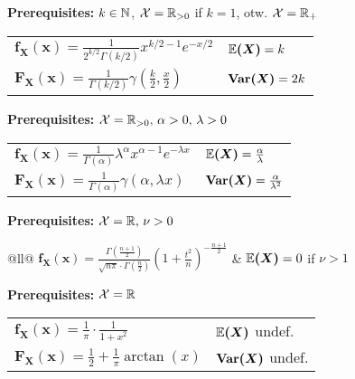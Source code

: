 \begin{cdefinition*}
  \textbf{Prerequisites:} \(k \in \mathbb{N}\), \(\operatorname{\mathcal{X}} = \mathbb{R}_{>0}\) if \(k = 1\), otw. \(\operatorname{\mathcal{X}} = \mathbb{R}_+\) \\
  \begin{tabularx}{\linewidth}{@{}ll@{}}
    \(\bm{f_X(x)} = \frac{1}{2^{k/2}\Gamma(k/2)} x^{k/2-1}e^{-x/2}\) & \(\bm{\mathbb{E}(X)} = k\) \\
    \(\bm{F_X(x)} = \frac{1}{\Gamma(k/2)} \gamma\left(\frac{k}{2}, \frac{x}{2}\right)\) & \(\bm{\Var(X)} = 2k\)
  \end{tabularx}
\end{cdefinition*}

\begin{cdefinition*}
  \textbf{Prerequisites:} \(\operatorname{\mathcal{X}} = \mathbb{R}_{>0}, \, \alpha > 0, \, \lambda > 0\) \\
  \begin{tabularx}{\linewidth}{@{}ll@{}}
    \(\bm{f_X(x)} = \frac{1}{\Gamma(\alpha)} \lambda^\alpha x^{\alpha - 1}e^{-\lambda x}\) & \(\bm{\mathbb{E}(X)} = \frac{\alpha}{\lambda}\) \\
    \(\bm{F_X(x)} = \frac{1}{\Gamma(\alpha)} \gamma(\alpha, \lambda x)\) & \(\bm{\Var(X)} = \frac{\alpha}{\lambda^2}\)
  \end{tabularx}
\end{cdefinition*}

\pagebreak
\begin{cdefinition*}
  \textbf{Prerequisites:} \(\operatorname{\mathcal{X}} = \mathbb{R}, \, \nu > 0\) \\
  \begin{tabularx}{\linewidth}{@{}ll@{}}
    \(\bm{f_X(x)} = \frac{\Gamma\left(\frac{n+1}{2}\right)}{\sqrt{n\pi} \cdot \Gamma(\frac{n}{2})} \left(1+\frac{t^2}{n}\right)^{-\frac{n+1}{2}}\) & \(\bm{\mathbb{E}(X)} = 0 \) if \(\nu > 1\) \\
  \end{tabularx}
\end{cdefinition*}

\begin{cdefinition*}[{Cauchy}]
  \textbf{Prerequisites:} \(\operatorname{\mathcal{X}} = \mathbb{R}\) \\
  \begin{tabularx}{\linewidth}{@{}ll@{}}
    \(\bm{f_X(x)} = \frac{1}{\pi}\cdot \frac{1}{1 + x^2}\) & \(\bm{\mathbb{E}(X)}\) undef. \\
    \(\bm{F_X(x)} = \frac{1}{2} + \frac{1}{\pi} \arctan(x)\) & \(\bm{\Var(X)}\) undef.
  \end{tabularx}
\end{cdefinition*}

\begin{center}
  
\end{center}
